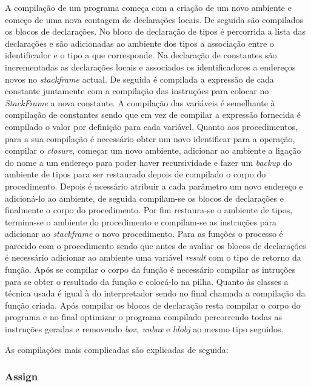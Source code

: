 A compilação de um programa começa com a criação de um novo ambiente e começo de uma nova contagem de declarações locais. De seguida são compilados os blocos de declarações. No bloco de declaração de tipos é percorrida a lista das declarações e são adicionadas ao ambiente dos tipos a associação entre o identificador e o tipo a que corresponde. Na declaração de constantes são incrementadas as declarações locais e associados os identificadores a endereços novos no \emph{stackframe} actual. De seguida é compilada a expressão de cada constante juntamente com a compilação das instruções para colocar no \emph{StackFrame} a nova constante. A compilação das variáveis é semelhante à compilação de constantes sendo que em vez de compilar a expressão fornecida é compilado o valor por definição para cada variável. Quanto aos procedimentos, para a sua compilação é necessário obter um novo identificar para a operação, compilar o \emph{closure}, começar um novo ambiente, adicionar ao ambiente a ligação do nome a um endereço para poder haver recursividade e fazer um \emph{backup} do ambiente de tipos para ser restaurado depois de compilado o corpo do procedimento. Depois é ncessário atribuir a cada parâmetro um novo endereço e adicioná-lo ao ambiente, de seguida compilam-se os blocos de declarações e finalmente o corpo do procedimento. Por fim restaura-se o ambiente de tipos, termina-se o ambiente do procedimento e compilam-se as instruções para adicionar ao \emph{stackframe} o novo procedimento. Para as funções o processo é parecido com o procedimento sendo que antes de avaliar os blocos de declarações é necessário adicionar ao ambiente uma variável \emph{result} com o tipo de retorno da função. Após se compilar o corpo da função é necessário compilar as intruções para se obter o resultado da função e colocá-lo na pilha. Quanto às classes a técnica usada é igual à do interpretador sendo no final chamada a compilação da função criada.
Após compilar os blocos de declaração resta compilar o corpo do programa e no final optimizar o programa compilado percorrendo todas as instruções geradas e removendo \emph{box, unbox} e \emph{ldobj} ao mesmo tipo seguidos.

As compilações mais complicadas são explicadas de seguida:

\subsubsection{Assign}



\newpage
